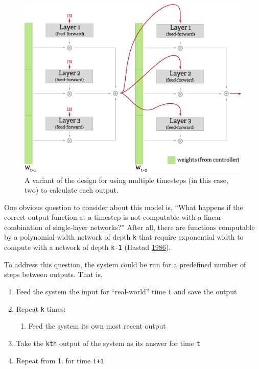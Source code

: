 \documentclass[12pt,twoside]{mitthesis}
\providecommand{\tightlist}{%
  \setlength{\itemsep}{0pt}\setlength{\parskip}{0pt}}
\begin{document}
\begin{figure}[htbp]
\centering
\includegraphics{../figures/multistep_small.png}
\caption{\label{fig:multistep}A variant of the design for using multiple
timesteps (in this case, two) to calculate each output.}
\end{figure}

One obvious question to consider about this model is, ``What happens if
the correct output function at a timestep is not computable with a
linear combination of single-layer networks?'' After all, there are
functions computable by a polynomial-width network of depth \texttt{k}
that require exponential width to compute with a network of depth
\texttt{k-1} (Hastad \protect\hyperlink{ref-hastad1986almost}{1986}).

To address this question, the system could be run for a predefined
number of steps between outputs. That is,

\begin{enumerate}
\def\labelenumi{\arabic{enumi}.}
\tightlist
\item
  Feed the system the input for ``real-world'' time \texttt{t} and save
  the output
\item
  Repeat \texttt{k} times:

  \begin{enumerate}
  \def\labelenumii{\alph{enumii}.}
  \tightlist
  \item
    Feed the system its own most recent output
  \end{enumerate}
\item
  Take the \texttt{kth} output of the system as its answer for time
  \texttt{t}
\item
  Repeat from 1. for time \texttt{t+1}
\end{enumerate}
\end{document}
